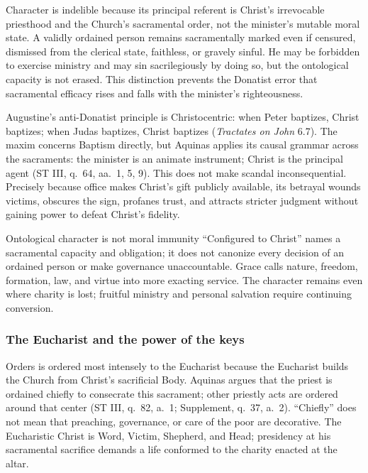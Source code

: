 Character is indelible because its principal referent is Christ's irrevocable priesthood and the Church's sacramental order, not the minister's mutable moral state. A validly ordained person remains sacramentally marked even if censured, dismissed from the clerical state, faithless, or gravely sinful. He may be forbidden to exercise ministry and may sin sacrilegiously by doing so, but the ontological capacity is not erased. This distinction prevents the Donatist error that sacramental efficacy rises and falls with the minister's righteousness.

Augustine's anti-Donatist principle is Christocentric: when Peter baptizes, Christ baptizes; when Judas baptizes, Christ baptizes (\emph{Tractates on John} 6.7). The maxim concerns Baptism directly, but Aquinas applies its causal grammar across the sacraments: the minister is an animate instrument; Christ is the principal agent (ST III, q.~64, aa.~1, 5, 9). This does not make scandal inconsequential. Precisely because office makes Christ's gift publicly available, its betrayal wounds victims, obscures the sign, profanes trust, and attracts stricter judgment without gaining power to defeat Christ's fidelity.

\begin{studybox}{Ontological character is not moral immunity}
``Configured to Christ'' names a sacramental capacity and obligation; it does not canonize every decision of an ordained person or make governance unaccountable. Grace calls nature, freedom, formation, law, and virtue into more exacting service. The character remains even where charity is lost; fruitful ministry and personal salvation require continuing conversion.
\end{studybox}

\subsubsection{The Eucharist and the power of the keys}

Orders is ordered most intensely to the Eucharist because the Eucharist builds the Church from Christ's sacrificial Body. Aquinas argues that the priest is ordained chiefly to consecrate this sacrament; other priestly acts are ordered around that center (ST III, q.~82, a.~1; Supplement, q.~37, a.~2). ``Chiefly'' does not mean that preaching, governance, or care of the poor are decorative. The Eucharistic Christ is Word, Victim, Shepherd, and Head; presidency at his sacramental sacrifice demands a life conformed to the charity enacted at the altar.

